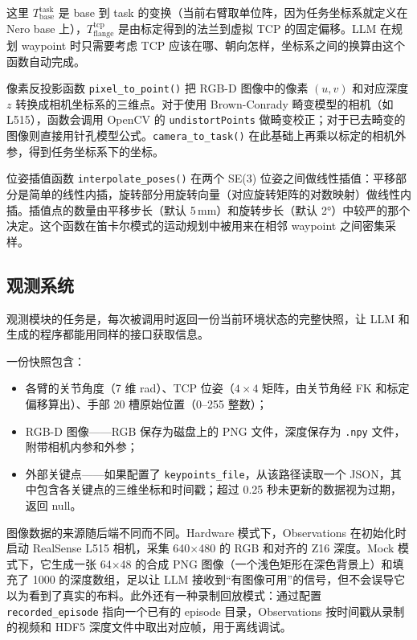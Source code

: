 这里 $T_{\text{base}}^{\text{task}}$ 是 base 到 task 的变换（当前右臂取单位阵，因为任务坐标系就定义在 Nero base 上），$T_{\text{flange}}^{\text{tcp}}$ 是由标定得到的法兰到虚拟 TCP 的固定偏移。LLM 在规划 waypoint 时只需要考虑 TCP 应该在哪、朝向怎样，坐标系之间的换算由这个函数自动完成。

像素反投影函数 \texttt{pixel\_to\_point()} 把 RGB-D 图像中的像素 $(u, v)$ 和对应深度 $z$ 转换成相机坐标系的三维点。对于使用 Brown-Conrady 畸变模型的相机（如 L515），函数会调用 OpenCV 的 \texttt{undistortPoints} 做畸变校正；对于已去畸变的图像则直接用针孔模型公式。\texttt{camera\_to\_task()} 在此基础上再乘以标定的相机外参，得到任务坐标系下的坐标。

位姿插值函数 \texttt{interpolate\_poses()} 在两个 SE(3) 位姿之间做线性插值：平移部分是简单的线性内插，旋转部分用旋转向量（对应旋转矩阵的对数映射）做线性内插。插值点的数量由平移步长（默认 5\,mm）和旋转步长（默认 2°）中较严的那个决定。这个函数在笛卡尔模式的运动规划中被用来在相邻 waypoint 之间密集采样。


\subsection{观测系统}
\label{subsec:agent-observations}

观测模块的任务是，每次被调用时返回一份当前环境状态的完整快照，让 LLM 和生成的程序都能用同样的接口获取信息。

一份快照包含：

\begin{itemize}
  \item 各臂的关节角度（7 维 rad）、TCP 位姿（$4\times4$ 矩阵，由关节角经 FK 和标定偏移算出）、手部 20 槽原始位置（0--255 整数）；
  \item RGB-D 图像——RGB 保存为磁盘上的 PNG 文件，深度保存为 \texttt{.npy} 文件，附带相机内参和外参；
  \item 外部关键点——如果配置了 \texttt{keypoints\_file}，从该路径读取一个 JSON，其中包含各关键点的三维坐标和时间戳；超过 0.25 秒未更新的数据视为过期，返回 null。
\end{itemize}

图像数据的来源随后端不同而不同。Hardware 模式下，Observations 在初始化时启动 RealSense L515 相机，采集 640$\times$480 的 RGB 和对齐的 Z16 深度。Mock 模式下，它生成一张 64$\times$48 的合成 PNG 图像（一个浅色矩形在深色背景上）和填充了 1000 的深度数组，足以让 LLM 接收到``有图像可用''的信号，但不会误导它以为看到了真实的布料。此外还有一种录制回放模式：通过配置 \texttt{recorded\_episode} 指向一个已有的 episode 目录，Observations 按时间戳从录制的视频和 HDF5 深度文件中取出对应帧，用于离线调试。

